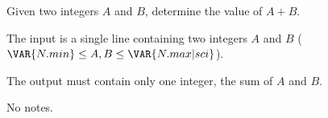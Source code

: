 Given two integers $A$ and $B$, determine the value of $A + B$.

The input is a single line containing two integers $A$ and $B$ ($\VAR{N.min} \leq A, B \leq \VAR{N.max | sci}$).

The output must contain only one integer, the sum of $A$ and $B$.

No notes.
